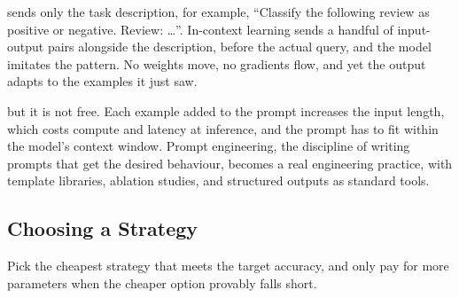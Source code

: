  sends only the task description, for example, ``Classify the following review as positive or negative. Review: \ldots''. In-context learning sends a handful of input-output pairs alongside the description, before the actual query, and the model imitates the pattern. No weights move, no gradients flow, and yet the output adapts to the examples it just saw.


 but it is not free. Each example added to the prompt increases the input length, which costs compute and latency at inference, and the prompt has to fit within the model's context window. Prompt engineering, the discipline of writing prompts that get the desired behaviour, becomes a real engineering practice, with template libraries, ablation studies, and structured outputs as standard tools.

\subsection{Choosing a Strategy}


 Pick the cheapest strategy that meets the target accuracy, and only pay for more parameters when the cheaper option provably falls short.

